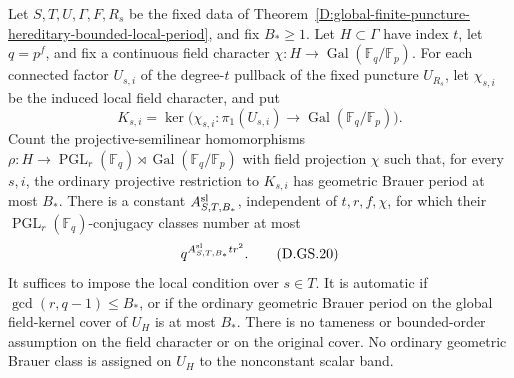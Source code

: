\begin{theorem}
\label{D:global-finite-puncture-hereditary-semilinear-local-period}
Let \(S,T,U,\Gamma,F,R_s\) be the fixed data of
Theorem~\ref{D:global-finite-puncture-hereditary-bounded-local-period},
and fix \(B_*\ge1\).
Let \(H\subset\Gamma\) have index \(t\), let
\(q=p^f\), and fix a continuous field character
\(\chi:H\to\operatorname{Gal}(\mathbb F_q/\mathbb F_p)\).
For each connected factor \(U_{s,i}\) of the
degree-\(t\) pullback of the fixed puncture
\(U_{R_s}\), let \(\chi_{s,i}\) be the induced
local field character, and put
\[
 K_{s,i}=\ker\bigl(\chi_{s,i}:
                \pi_1(U_{s,i})\to
                    \operatorname{Gal}(\mathbb F_q/\mathbb F_p)\bigr).
                                                        \tag{D.GS.19}
\]
Count the projective-semilinear homomorphisms
\(\rho:H\to\operatorname{PGL}_r(\mathbb F_q)\rtimes
\operatorname{Gal}(\mathbb F_q/\mathbb F_p)\)
with field projection \(\chi\) such that, for
every \(s,i\), the ordinary projective restriction
to \(K_{s,i}\) has geometric Brauer period at most
\(B_*\).
There is a constant \(A^{\rm sl}_{S,T,B_*}\),
independent of \(t,r,f,\chi\), for which their
\(\operatorname{PGL}_r(\mathbb F_q)\)-conjugacy
classes number at most
\[
                    q^{A^{\rm sl}_{S,T,B_*}t r^2}.
                                                        \tag{D.GS.20}
\]
It suffices to impose the local condition over
\(s\in T\). It is automatic if
\(\gcd(r,q-1)\le B_*\), or if the ordinary
geometric Brauer period on the global field-kernel
cover of \(U_H\) is at most \(B_*\).
There is no tameness or bounded-order assumption
on the field character or on the original cover.
No ordinary geometric Brauer class is assigned
on \(U_H\) to the nonconstant scalar band.
\end{theorem}

